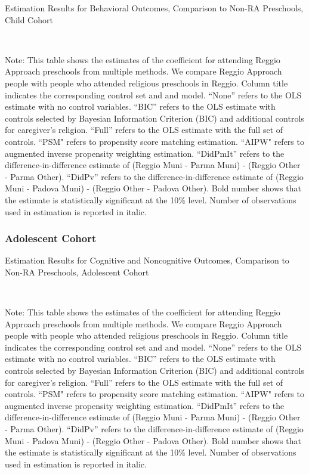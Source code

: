 \begin{table}[H] \caption{Estimation Results for Behavioral Outcomes, Comparison to Non-RA Preschools, Child Cohort} \label{ols-B-child-reg-reli}
\scalebox{0.8}{}
\vspace{1ex} \\
\footnotesize\raggedright{Note: This table shows the estimates of the coefficient for attending Reggio Approach preschools from multiple methods. We compare Reggio Approach people with people who attended religious preschools in Reggio. Column title indicates the corresponding control set and and model. ``None'' refers to the OLS estimate with no control variables. ``BIC'' refers to the OLS estimate with controls selected by Bayesian Information Criterion (BIC) and additional controls for caregiver's religion. ``Full'' refers to the OLS estimate with the full set of controls. ``PSM" refers to propensity score matching estimation. ``AIPW" refers to augmented inverse propensity weighting estimation. ``DidPmIt'' refers to the difference-in-difference estimate of (Reggio Muni - Parma Muni) - (Reggio Other - Parma Other). ``DidPv'' refers to the difference-in-difference estimate of (Reggio Muni - Padova Muni) - (Reggio Other - Padova Other). Bold number shows that the estimate is statistically significant at the 10\% level. Number of observations used in estimation is reported in italic.}
\end{table}



\subsubsection{Adolescent Cohort}
\begin{table}[H] \caption{Estimation Results for Cognitive and Noncognitive Outcomes, Comparison to Non-RA Preschools, Adolescent Cohort} \label{ols-CN-adol-reg-reli}
\scalebox{0.8}{}
\vspace{1ex} \\
\footnotesize\raggedright{Note: This table shows the estimates of the coefficient for attending Reggio Approach preschools from multiple methods. We compare Reggio Approach people with people who attended religious preschools in Reggio. Column title indicates the corresponding control set and and model. ``None'' refers to the OLS estimate with no control variables. ``BIC'' refers to the OLS estimate with controls selected by Bayesian Information Criterion (BIC) and additional controls for caregiver's religion. ``Full'' refers to the OLS estimate with the full set of controls. ``PSM" refers to propensity score matching estimation. ``AIPW" refers to augmented inverse propensity weighting estimation. ``DidPmIt'' refers to the difference-in-difference estimate of (Reggio Muni - Parma Muni) - (Reggio Other - Parma Other). ``DidPv'' refers to the difference-in-difference estimate of (Reggio Muni - Padova Muni) - (Reggio Other - Padova Other). Bold number shows that the estimate is statistically significant at the 10\% level. Number of observations used in estimation is reported in italic.}
\end{table}


